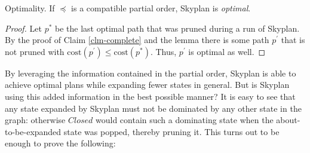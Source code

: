 \documentclass[letterpaper]{article}
\theoremstyle{plain} \newtheorem{theorem}{Theorem} \newtheorem{proposition}{Proposition} \newtheorem{lemma}{Lemma}
\theoremstyle{definition} \newtheorem{definition}{Definition} \newtheorem{conjecture}{Conjecture} \newtheorem*{example}{Example}
\theoremstyle{remark} \newtheorem*{remark}{Remark} \newtheorem*{note}{Note} \newtheorem{case}{Case}
\begin{document}
\begin{claim}{Optimality.}\label{clm-optimal}
   If $\preceq$ is a compatible partial order, Skyplan
is \emph{optimal}.
\end{claim}
\begin{proof} 
Let $p^{*}$ be the last optimal path that was pruned during a run of Skyplan. 
By the proof of Claim \ref{clm-complete} and the lemma %
there is some path $p^\prime$ that is not pruned with
$\mathrm{cost}(p^\prime) \leq \mathrm{cost}(p^{*})$.
Thus, $p^\prime$ is optimal as well.
\end{proof}

By leveraging the information contained in the partial order, Skyplan is able to achieve
optimal plans while expanding fewer states in general.  But is Skyplan using this added
information in the best possible manner? It is easy to see that any state expanded by 
Skyplan must not be dominated by any other state in the graph: otherwise $Closed$ would
contain such a dominating state when the about-to-be-expanded
state was popped, thereby pruning it.  This turns out to be
enough to prove the following:
\end{document}
